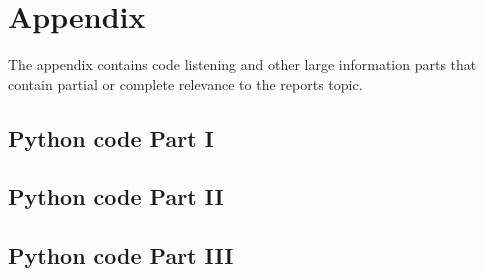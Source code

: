\section{Appendix} \label{sec: Appendix}
The appendix contains code listening and other large information parts that contain partial or complete relevance to the reports topic. 

\subsection{Python code Part I} \label{subsec: Python code Part I}



\subsection{Python code Part II} \label{subsec: Python code Part II}



\subsection{Python code Part III} \label{subsec: Python code Part III}



